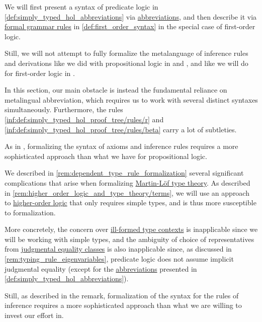 \begin{remark}\label{rem:predicate_logic_formalization}
  We will first present a syntax of predicate logic in \cref{def:simply_typed_hol_abbreviations} via \hyperref[con:metalingual_abbreviation]{abbreviations}, and then describe it via \hyperref[def:formal_grammar]{formal grammar rules} in \cref{def:first_order_syntax} in the special case of first-order logic.

  Still, we will not attempt to fully formalize the metalanguage of inference rules and derivations like we did with propositional logic in  and , and like we will do for first-order logic in .

  In this section, our main obstacle is instead the fundamental reliance on metalingual abbreviation, which requires us to work with several distinct syntaxes simultaneously. Furthermore, the rules \ref{inf:def:simply_typed_hol_proof_tree/rules/r} and \ref{inf:def:simply_typed_hol_proof_tree/rules/beta} carry a lot of subtleties.

  As in , formalizing the syntax of axioms and inference rules requires a more sophisticated approach than what we have for propositional logic.
\end{remark}
\begin{comments}
  \item We described in \cref{rem:dependent_type_rule_formalization} several significant complications that arise when formalizing \hyperref[def:mltt]{Martin-L\"of type theory}. As described in \cref{rem:higher_order_logic_and_type_theory/terms}, we will use an approach to \hyperref[rem:predicate_logic]{higher-order logic} that only requires simple types, and is thus more susceptible to formalization.

  More concretely, the concern over \hyperref[rem:well_formed_contexts]{ill-formed type contexts} is inapplicable since we will be working with simple types, and the ambiguity of choice of representatives from \hyperref[con:equality]{judgmental equality classes} is also inapplicable since, as discussed in \cref{rem:typing_rule_eigenvariables}, predicate logic does not assume implicit judgmental equality (except for the \hyperref[con:metalingual_abbreviation]{abbreviations} presented in \cref{def:simply_typed_hol_abbreviations}).

  Still, as described in the remark, formalization of the syntax for the rules of inference requires a more sophisticated approach than what we are willing to invest our effort in.
\end{comments}

